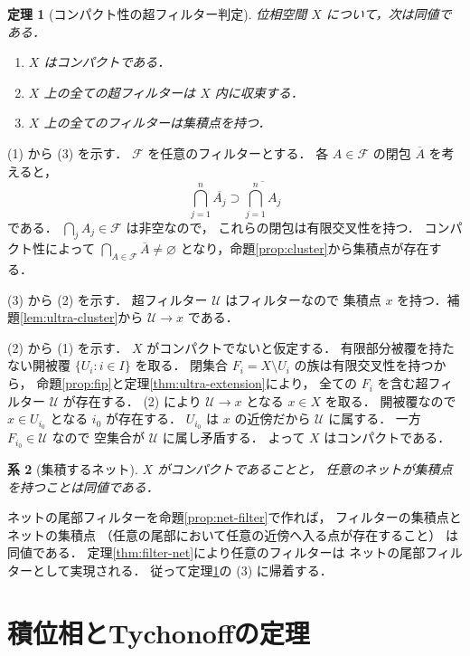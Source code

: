 \documentclass[a5paper,10pt,onecolumn]{jsarticle}
\makeatletter
\theoremstyle{mathnotetheorem}
\newtheorem{theorem}{定理}[section]
\newtheorem{corollary}[theorem]{系}
\renewcommand{\proofname}{証明}
\renewenvironment{proof}[1][\proofname]{%
  \par\pushQED{\qed}\normalfont\topsep4\p@\@plus2\p@\relax
  \trivlist\item[\hskip\labelsep\bfseries #1]\ignorespaces
}{\popQED\endtrivlist\@endpefalse}
\makeatother
\begin{document}
\begin{theorem}[コンパクト性の超フィルター判定]
\label{thm:compact-ultra}
位相空間 $X$ について，次は同値である．
\begin{enumerate}
\item $X$ はコンパクトである．
\item $X$ 上の全ての超フィルターは $X$ 内に収束する．
\item $X$ 上の全てのフィルターは集積点を持つ．
\end{enumerate}
\end{theorem}
\begin{proof}
(1) から (3) を示す．
$\mathcal F$ を任意のフィルターとする．
各 $A\in\mathcal F$ の閉包 $\overline A$ を考えると，
\[
 \bigcap_{j=1}^n\overline{A_j}
 \supset\overline{\bigcap_{j=1}^nA_j}
\]
である．
$\bigcap_jA_j\in\mathcal F$ は非空なので，
これらの閉包は有限交叉性を持つ．
コンパクト性によって
$\bigcap_{A\in\mathcal F}\overline A\ne\varnothing$
となり，命題\ref{prop:cluster}から集積点が存在する．

(3) から (2) を示す．
超フィルター $\mathcal U$ はフィルターなので
集積点 $x$ を持つ．補題\ref{lem:ultra-cluster}から
$\mathcal U\to x$ である．

(2) から (1) を示す．
$X$ がコンパクトでないと仮定する．
有限部分被覆を持たない開被覆 $\{U_i:i\in I\}$ を取る．
閉集合 $F_i=X\setminus U_i$ の族は有限交叉性を持つから，
命題\ref{prop:fip}と定理\ref{thm:ultra-extension}により，
全ての $F_i$ を含む超フィルター $\mathcal U$ が存在する．
(2) により $\mathcal U\to x$ となる $x\in X$ を取る．
開被覆なので $x\in U_{i_0}$ となる $i_0$ が存在する．
$U_{i_0}$ は $x$ の近傍だから $\mathcal U$ に属する．
一方 $F_{i_0}\in\mathcal U$ なので
空集合が $\mathcal U$ に属し矛盾する．
よって $X$ はコンパクトである．
\end{proof}

\begin{corollary}[集積するネット]\label{cor:compact-net}
$X$ がコンパクトであることと，
任意のネットが集積点を持つことは同値である．
\end{corollary}
\begin{proof}
ネットの尾部フィルターを命題\ref{prop:net-filter}で作れば，
フィルターの集積点とネットの集積点
（任意の尾部において任意の近傍へ入る点が存在すること）
は同値である．
定理\ref{thm:filter-net}により任意のフィルターは
ネットの尾部フィルターとして実現される．
従って定理\ref{thm:compact-ultra}の (3) に帰着する．
\end{proof}

\section{積位相とTychonoffの定理}
\end{document}
